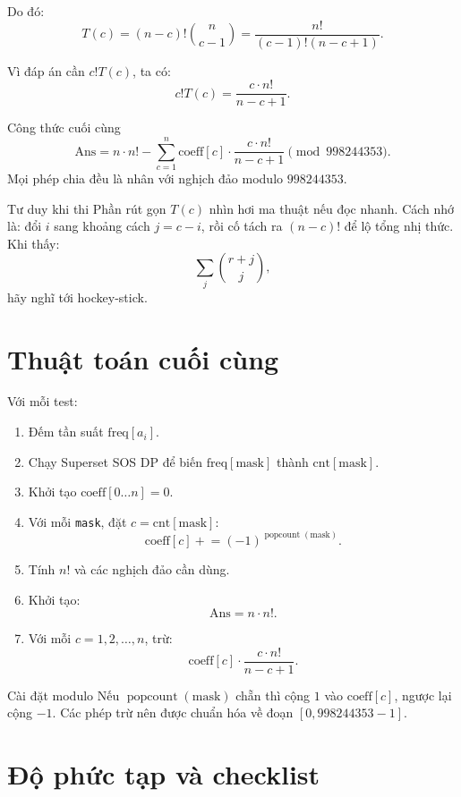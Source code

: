 \documentclass[12pt]{article}
\newcommand{\MOD}{998244353}
\newcommand{\popc}{\operatorname{popcount}}
\newcommand{\cnt}{\mathrm{cnt}}
\newcommand{\coef}{\mathrm{coeff}}
\newcommand{\freq}{\mathrm{freq}}
\newcommand{\msk}{\mathrm{mask}}
\begin{document}
Do đó:
\[
T(c)
=
(n-c)!\binom{n}{c-1}
=
\frac{n!}{(c-1)!(n-c+1)}.
\]

Vì đáp án cần \(c!T(c)\), ta có:
\[
c!T(c)
=
\frac{c\cdot n!}{n-c+1}.
\]

\begin{resultbox}{Công thức cuối cùng}
\[
\boxed{
\mathrm{Ans}
=
n\cdot n!
-
\sum_{c=1}^{n}
\coef[c]\cdot
\frac{c\cdot n!}{n-c+1}
}
\pmod{\MOD}.
\]
Mọi phép chia đều là nhân với nghịch đảo modulo \(\MOD\).
\end{resultbox}

\begin{thinkbox}{Tư duy khi thi}
Phần rút gọn \(T(c)\) nhìn hơi ma thuật nếu đọc nhanh. Cách nhớ là: đổi \(i\) sang khoảng cách \(j=c-i\), rồi cố tách ra \((n-c)!\) để lộ tổng nhị thức. Khi thấy:
\[
\sum_j \binom{r+j}{j},
\]
hãy nghĩ tới hockey-stick.
\end{thinkbox}

\section{Thuật toán cuối cùng}

Với mỗi test:
\begin{enumerate}
    \item Đếm tần suất \(\freq[a_i]\).
    \item Chạy Superset SOS DP để biến \(\freq[\msk]\) thành \(\cnt[\msk]\).
    \item Khởi tạo \(\coef[0\ldots n]=0\).
    \item Với mỗi \texttt{mask}, đặt \(c=\cnt[\msk]\):
    \[
    \coef[c]\mathrel{+}=(-1)^{\popc(\msk)}.
    \]
    \item Tính \(n!\) và các nghịch đảo cần dùng.
    \item Khởi tạo:
    \[
    \mathrm{Ans}=n\cdot n!.
    \]
    \item Với mỗi \(c=1,2,\ldots,n\), trừ:
    \[
    \coef[c]\cdot \frac{c\cdot n!}{n-c+1}.
    \]
\end{enumerate}

\begin{notebox}{Cài đặt modulo}
Nếu \(\popc(\msk)\) chẵn thì cộng \(1\) vào \(\coef[c]\), ngược lại cộng \(-1\). Các phép trừ nên được chuẩn hóa về đoạn \([0,\MOD-1]\).
\end{notebox}

\section{Độ phức tạp và checklist}
\end{document}
